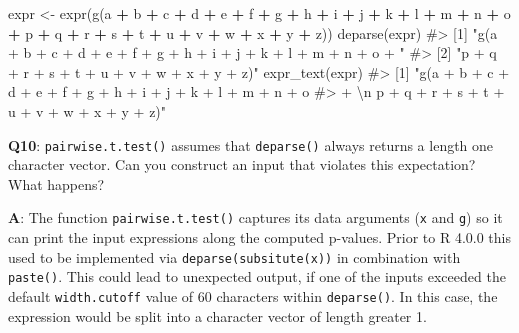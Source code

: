 \documentclass[
]{krantz}
\makeatletter
\newenvironment{Shaded}{\begin{snugshade}}{\end{snugshade}}
\newcommand{\CommentTok}[1]{\textcolor[rgb]{0.56,0.35,0.01}{\textit{#1}}}
\newcommand{\KeywordTok}[1]{\textcolor[rgb]{0.13,0.29,0.53}{\textbf{#1}}}
\newcommand{\NormalTok}[1]{#1}
\newcommand{\OperatorTok}[1]{\textcolor[rgb]{0.81,0.36,0.00}{\textbf{#1}}}
\newcommand{\StringTok}[1]{\textcolor[rgb]{0.31,0.60,0.02}{#1}}
\newenvironment{kframe}{%
\medskip{}
\setlength{\fboxsep}{.8em}
 \def\at@end@of@kframe{}%
 \ifinner\ifhmode%
  \def\at@end@of@kframe{\end{minipage}}%
  \begin{minipage}{\columnwidth}%
 \fi\fi%
 \def\FrameCommand##1{\hskip\@totalleftmargin \hskip-\fboxsep
 \colorbox{shadecolor}{##1}\hskip-\fboxsep
     \hskip-\linewidth \hskip-\@totalleftmargin \hskip\columnwidth}%
 \MakeFramed {\advance\hsize-\width
   \@totalleftmargin\z@ \linewidth\hsize
   \@setminipage}}%
 {\par\unskip\endMakeFramed%
 \at@end@of@kframe}
\renewenvironment{Shaded}{\begin{kframe}}{\end{kframe}}
\renewcommand{\KeywordTok} [1]{\textcolor[rgb]{0.00,0.44,0.13}{{#1}}}
\renewcommand{\StringTok}  [1]{\textcolor[rgb]{0.25,0.44,0.63}{{#1}}}
\renewcommand{\CommentTok} [1]{\textcolor[rgb]{0.38,0.63,0.69}{{#1}}}
\renewcommand{\NormalTok}  [1]{{#1}}
\makeatother
\begin{document}
\begin{Shaded}
\begin{Highlighting}[]
\NormalTok{expr <-}\StringTok{ }\KeywordTok{expr}\NormalTok{(}\KeywordTok{g}\NormalTok{(a }\OperatorTok{+}\StringTok{ }\NormalTok{b }\OperatorTok{+}\StringTok{ }\NormalTok{c }\OperatorTok{+}\StringTok{ }\NormalTok{d }\OperatorTok{+}\StringTok{ }\NormalTok{e }\OperatorTok{+}\StringTok{ }\NormalTok{f }\OperatorTok{+}\StringTok{ }\NormalTok{g }\OperatorTok{+}\StringTok{ }\NormalTok{h }\OperatorTok{+}\StringTok{ }\NormalTok{i }\OperatorTok{+}\StringTok{ }\NormalTok{j }\OperatorTok{+}\StringTok{ }\NormalTok{k }\OperatorTok{+}\StringTok{ }\NormalTok{l }\OperatorTok{+}\StringTok{ }
\StringTok{                 }\NormalTok{m }\OperatorTok{+}\StringTok{ }\NormalTok{n }\OperatorTok{+}\StringTok{ }\NormalTok{o }\OperatorTok{+}\StringTok{ }\NormalTok{p }\OperatorTok{+}\StringTok{ }\NormalTok{q }\OperatorTok{+}\StringTok{ }\NormalTok{r }\OperatorTok{+}\StringTok{ }\NormalTok{s }\OperatorTok{+}\StringTok{ }\NormalTok{t }\OperatorTok{+}\StringTok{ }\NormalTok{u }\OperatorTok{+}\StringTok{ }\NormalTok{v }\OperatorTok{+}\StringTok{ }\NormalTok{w }\OperatorTok{+}\StringTok{ }\NormalTok{x }\OperatorTok{+}\StringTok{ }\NormalTok{y }\OperatorTok{+}\StringTok{ }\NormalTok{z))}
\KeywordTok{deparse}\NormalTok{(expr)}
\CommentTok{#> [1] "g(a + b + c + d + e + f + g + h + i + j + k + l + m + n + o + "}
\CommentTok{#> [2] "p + q + r + s + t + u + v + w + x + y + z)"}
\KeywordTok{expr_text}\NormalTok{(expr)}
\CommentTok{#> [1] "g(a + b + c + d + e + f + g + h + i + j + k + l + m + n + o }
\CommentTok{#> + \textbackslash{}n    p + q + r + s + t + u + v + w + x + y + z)"}
\end{Highlighting}
\end{Shaded}

\textbf{{Q10}}: \texttt{pairwise.t.test()} assumes that \texttt{deparse()} always returns a length one character vector. Can you construct an input that violates this expectation? What happens?

\textbf{{A}}: The function \texttt{pairwise.t.test()} captures its data arguments (\texttt{x} and \texttt{g}) so it can print the input expressions along the computed p-values. Prior to R 4.0.0 this used to be implemented via \texttt{deparse(subsitute(x))} in combination with \texttt{paste()}. This could lead to unexpected output, if one of the inputs exceeded the default \texttt{width.cutoff} value of 60 characters within \texttt{deparse()}. In this case, the expression would be split into a character vector of length greater 1.
\end{document}

